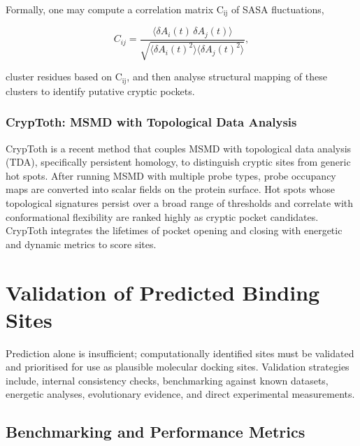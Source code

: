 \documentclass[12pt]{article}
\begin{document}
Formally, one may compute a correlation matrix $\textrm{C}_{\textrm{ij}}$ of SASA fluctuations,

\begin{equation}
C_{ij} = \frac{\langle \delta A_i(t) \, \delta A_j(t) \rangle}{\sqrt{\langle \delta A_i(t)^2 \rangle \langle \delta A_j(t)^2 \rangle}},
\end{equation}

cluster residues based on $\textrm{C}_{\textrm{ij}}$, and then analyse structural mapping of these clusters to identify putative cryptic pockets\cite{CH5_amaro2019will,CH5_Kuzmanic2020}.

\subsubsection{CrypToth: MSMD with Topological Data Analysis}

CrypToth\cite{CH5_koseki2025cryptoth} is a recent method that couples MSMD with topological data analysis (TDA), specifically persistent homology, to distinguish cryptic sites from generic hot spots. After running MSMD with multiple probe types, probe occupancy maps are converted into scalar fields on the protein surface. Hot spots whose topological signatures persist over a broad range of thresholds and correlate with conformational flexibility are ranked highly as cryptic pocket candidates\cite{CH5_koseki2025cryptoth,CH5_Gasparikova2025}. CrypToth\cite{CH5_koseki2025cryptoth} integrates the lifetimes of pocket opening and closing with energetic and dynamic metrics to score sites.

\section{Validation of Predicted Binding Sites}

Prediction alone is insufficient; computationally identified sites must be validated and prioritised for use as plausible molecular docking sites. Validation strategies include, internal consistency checks, benchmarking against known datasets, energetic analyses, evolutionary evidence, and direct experimental measurements.

\subsection{Benchmarking and Performance Metrics}
\end{document}
